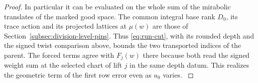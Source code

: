 \begin{proof}
In particular it can be evaluated on the
whole sum of the mirabolic translates of the marked good space.
The common integral base rank \(D_0\), its trace action and
its projected lattices at \(\mu(w)\) are those of
Section~\ref{subsec:division-level-pins}. Thus
\eqref{eq:run-cut}, with its rounded depth and the signed
twist comparison above, bounds the two transported indices
of the parent. The forced terms agree with \(F_j(w)\) there
because both read the signed weight sum at the selected chart
of lift \(j\) in the same depth datum. This realizes the
geometric term of the first row error even as \(u_0\) varies.
\label{cor:paired-row-indices-8}
\end{proof}
